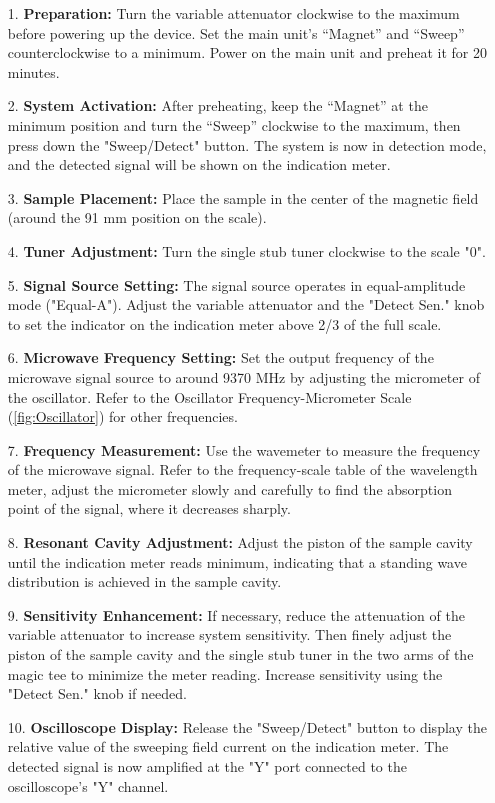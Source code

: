 \documentclass[11pt]{article}
\begin{document}
	\begin{enumerate}
		\item[1.] \textbf{Preparation:} Turn the variable attenuator clockwise to the maximum before powering up the device. Set the main unit’s “Magnet” and “Sweep” counterclockwise to a minimum. Power on the main unit and preheat it for 20 minutes.
		\item[2.] \textbf{System Activation:} After preheating, keep the “Magnet” at the minimum position and turn the “Sweep” clockwise to the maximum, then press down the "Sweep/Detect" button. The system is now in detection mode, and the detected signal will be shown on the indication meter.
		\item[3.] \textbf{Sample Placement:} Place the sample in the center of the magnetic field (around the 91 mm position on the scale).
		\item[4.] \textbf{Tuner Adjustment:} Turn the single stub tuner clockwise to the scale "0".
		\item[5.] \textbf{Signal Source Setting:} The signal source operates in equal-amplitude mode ("Equal-A"). Adjust the variable attenuator and the "Detect Sen." knob to set the indicator on the indication meter above 2/3 of the full scale.
		\item[6.] \textbf{Microwave Frequency Setting:} Set the output frequency of the microwave signal source to around 9370 MHz by adjusting the micrometer of the oscillator. Refer to the Oscillator Frequency-Micrometer Scale (\ref{fig:Oscillator}) for other frequencies.
		\item[7.] \textbf{Frequency Measurement:} Use the wavemeter to measure the frequency of the microwave signal. Refer to the frequency-scale table of the wavelength meter, adjust the micrometer slowly and carefully to find the absorption point of the signal, where it decreases sharply.
		\item[8.] \textbf{Resonant Cavity Adjustment:} Adjust the piston of the sample cavity until the indication meter reads minimum, indicating that a standing wave distribution is achieved in the sample cavity.
		\item[9.] \textbf{Sensitivity Enhancement:} If necessary, reduce the attenuation of the variable attenuator to increase system sensitivity. Then finely adjust the piston of the sample cavity and the single stub tuner in the two arms of the magic tee to minimize the meter reading. Increase sensitivity using the "Detect Sen." knob if needed.
		\item[10.] \textbf{Oscilloscope Display:} Release the "Sweep/Detect" button to display the relative value of the sweeping field current on the indication meter. The detected signal is now amplified at the "Y" port connected to the oscilloscope's "Y" channel.

\end{enumerate}
\end{document}

